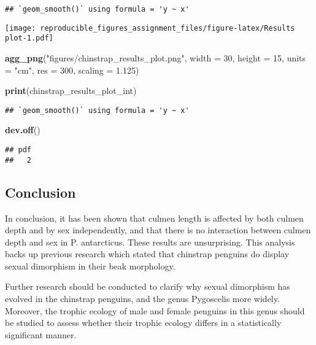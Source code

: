 \documentclass[
]{article}
\newenvironment{Shaded}{\begin{snugshade}}{\end{snugshade}}
\newcommand{\AttributeTok}[1]{\textcolor[rgb]{0.13,0.29,0.53}{#1}}
\newcommand{\DecValTok}[1]{\textcolor[rgb]{0.00,0.00,0.81}{#1}}
\newcommand{\FloatTok}[1]{\textcolor[rgb]{0.00,0.00,0.81}{#1}}
\newcommand{\FunctionTok}[1]{\textcolor[rgb]{0.13,0.29,0.53}{\textbf{#1}}}
\newcommand{\NormalTok}[1]{#1}
\newcommand{\StringTok}[1]{\textcolor[rgb]{0.31,0.60,0.02}{#1}}
\begin{document}
\begin{verbatim}
## `geom_smooth()` using formula = 'y ~ x'
\end{verbatim}

\texttt{[image: reproducible\_figures\_assignment\_files/figure-latex/Results plot-1.pdf]}

\begin{Shaded}
\begin{Highlighting}[]
\FunctionTok{agg\_png}\NormalTok{(}\StringTok{"figures/chinstrap\_results\_plot.png"}\NormalTok{, }
        \AttributeTok{width =} \DecValTok{30}\NormalTok{,}
        \AttributeTok{height =} \DecValTok{15}\NormalTok{,}
        \AttributeTok{units =} \StringTok{"cm"}\NormalTok{,}
        \AttributeTok{res =} \DecValTok{300}\NormalTok{,}
        \AttributeTok{scaling =} \FloatTok{1.125}\NormalTok{)}

\FunctionTok{print}\NormalTok{(chinstrap\_results\_plot\_int)}
\end{Highlighting}
\end{Shaded}

\begin{verbatim}
## `geom_smooth()` using formula = 'y ~ x'
\end{verbatim}

\begin{Shaded}
\begin{Highlighting}[]
\FunctionTok{dev.off}\NormalTok{()}
\end{Highlighting}
\end{Shaded}

\begin{verbatim}
## pdf 
##   2
\end{verbatim}

\subsection{Conclusion}\label{conclusion}

In conclusion, it has been shown that culmen length is affected by both
culmen depth and by sex independently, and that there is no interaction
between culmen depth and sex in P. antarcticus. These results are
unsurprising. This analysis backs up previous research which stated that
chinstrap penguins do display sexual dimorphism in their beak
morphology.

Further research should be conducted to clarify why sexual dimorphism
has evolved in the chinstrap penguins, and the genus Pygoscelis more
widely. Moreover, the trophic ecology of male and female penguins in
this genus should be studied to assess whether their trophic ecology
differs in a statistically significant manner.
\end{document}
